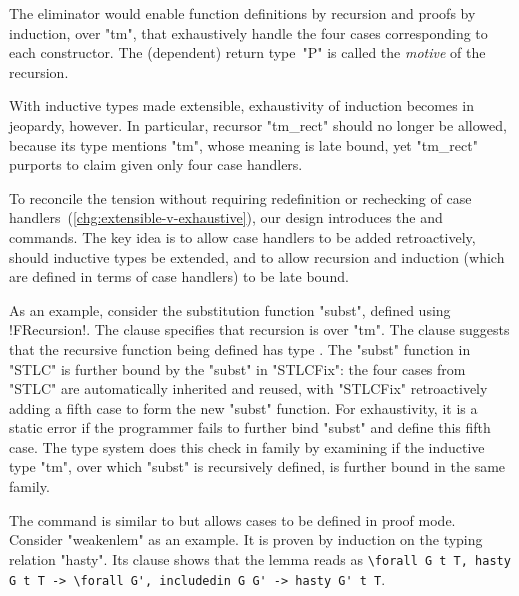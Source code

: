 \noindent
The eliminator would enable function definitions by recursion
and proofs by induction, over "tm", that exhaustively
handle the four cases corresponding to each constructor.
The (dependent) return type~"P" is called the \emph{motive} of the recursion.

With inductive types made extensible, exhaustivity of induction becomes
in jeopardy, however.
In particular, recursor "tm_rect" should no longer be allowed, because
its type mentions "tm", whose meaning is late bound, yet
"tm_rect" purports to claim  given only four case handlers.

To reconcile the tension without requiring redefinition or rechecking of
case handlers~(\ref{chg:extensible-v-exhaustive}),
our design introduces the  and  commands.
The key idea is to allow case handlers to be added retroactively, should
inductive types be extended, and to allow recursion and induction (which are defined in terms of case handlers) to be late bound.

As an example, consider the substitution function "subst", defined using
\lsti!FRecursion!.
The  clause specifies that recursion is over "tm".
The  clause suggests that the recursive function being
defined has type .
%
The "subst" function in "STLC" is further bound by the "subst" in "STLCFix":
the four cases from "STLC" are automatically inherited and reused,
with "STLCFix" retroactively adding a fifth case to form the new "subst" function.
%
For exhaustivity, it is a static error if the programmer fails to
further bind "subst" and define this fifth case.
The type system does this check in family 
by examining if the inductive type "tm",
over which "subst" is recursively defined, is further bound in the same family.

The  command is similar to  but
allows cases to be defined in proof mode.
Consider "weakenlem" as an example.
It is proven by induction on the typing relation "hasty".
Its  clause shows that the lemma reads as
\lstinline[basicstyle=\fontsize{8}{9}\ttfamily]!\forall G t T, hasty G t T -> \forall G', includedin G G' -> hasty G' t T!.



